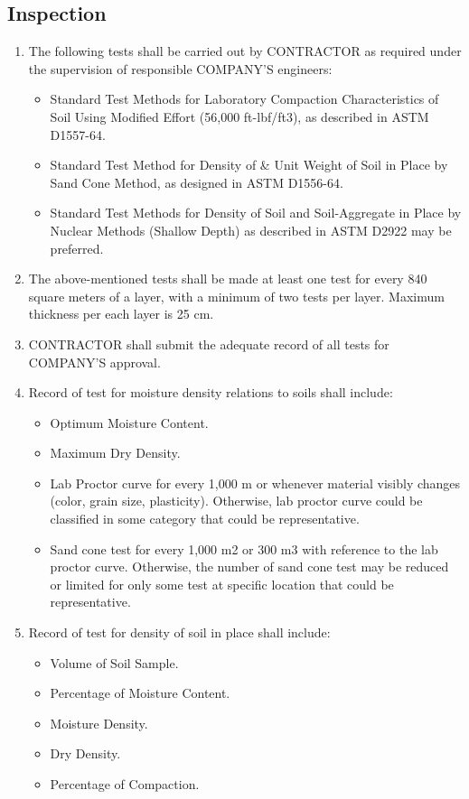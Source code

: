 \documentclass{article}%
\begin{document}
\subsection{Inspection}%
\label{subsec:Inspection}%
\begin{enumerate}[label=\alph*),start=1]%
\item%
The following tests shall be carried out by CONTRACTOR as required under the supervision of responsible COMPANY'S engineers:%
\begin{itemize}%
\item%
Standard Test Methods for Laboratory Compaction Characteristics of Soil Using Modified Effort (56,000 ft{-}lbf/ft3), as described in ASTM D1557{-}64.%
\item%
Standard Test Method for Density of \& Unit Weight of Soil in Place by Sand Cone Method, as designed in ASTM D1556{-}64.%
\item%
Standard Test Methods for Density of Soil and Soil{-}Aggregate in Place by Nuclear Methods (Shallow Depth) as described in ASTM D2922 may be preferred.%
\end{itemize}%
\item%
The above{-}mentioned tests shall be made at least one test for every 840 square meters of a layer, with a minimum of two tests per layer. Maximum thickness per each layer is 25 cm.%
\item%
CONTRACTOR shall submit the adequate record of all tests for COMPANY'S approval.%
\item%
Record of test for moisture density relations to soils shall include:%
\begin{itemize}%
\item%
Optimum Moisture Content.%
\item%
Maximum Dry Density.%
\item%
Lab Proctor curve for every 1,000 m or whenever material visibly changes (color, grain size, plasticity). Otherwise, lab proctor curve could be classified in some category that could be representative.%
\item%
Sand cone test for every 1,000 m2 or 300 m3 with reference to the lab proctor curve. Otherwise, the number of sand cone test may be reduced or limited for only some test at specific location that could be representative.%
\end{itemize}%
\item%
Record of test for density of soil in place shall include:%
\begin{itemize}%
\item%
Volume of Soil Sample.%
\item%
Percentage of Moisture Content.%
\item%
Moisture Density.%
\item%
Dry Density.%
\item%
Percentage of Compaction.%
\end{itemize}%
\end{enumerate}
\end{document}
